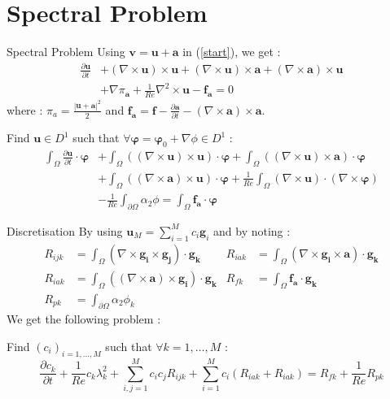 \documentclass{beamer}
\newcommand{\grad}{{\nabla}}
\newcommand{\curl}{{\nabla\times}}
\newcommand{\curll}{{\nabla^2\times}}
\begin{document}
\section{Spectral Problem}
\begin{frame}{Spectral Problem}
Using $\mathbf{v}=\mathbf{u}+\mathbf{a}$ in (\ref{start}), we get :
\begin{align*}
\frac{\partial \mathbf{u}}{\partial t} &+ (\curl \mathbf{u})\times \mathbf{u} + (\curl \mathbf{u})\times \mathbf{a} + \left(\curl \mathbf{a}\right)\times \mathbf{u} \\
&+ \grad\pi_\mathbf{a} + \frac{1}{Re}\curll \mathbf{u} - \mathbf{f_a} = 0
\end{align*}
where : $\pi_a=\frac{|\mathbf{u}+\mathbf{a}|^2}{2}$ and $\mathbf{f_a}=\mathbf{f}-\frac{\partial \mathbf{a}}{\partial t}-(\curl\mathbf{a})\times\mathbf{a}$.
\begin{block}{Find $\mathbf{u}\in D^1$ such that $\forall \bm{\varphi}=\bm{\varphi}_0+\grad\phi\in D^1$ :}
\begin{align*}
\int_\Omega \frac{\partial \mathbf{u}}{\partial t}\cdot \bm{\varphi} &+ \int_\Omega ((\curl \mathbf{u})\times \mathbf{u})\cdot \bm{\varphi} + \int_\Omega ((\curl \mathbf{u})\times \mathbf{a})\cdot\bm{\varphi} \\
&+ \int_\Omega ((\curl \mathbf{a})\times \mathbf{u})\cdot\bm{\varphi} + \frac{1}{Re}\int_\Omega (\curl \mathbf{u})\cdot(\curl\bm{\varphi}) \\
&-\frac{1}{Re}\int_{\partial\Omega} \alpha_2\phi = \int_\Omega \mathbf{f_a}\cdot\bm{\varphi}
\end{align*}
\end{block}
\end{frame}

\begin{frame}{Discretisation}
By using $\mathbf{u}_M=\sum_{i=1}^M c_i\mathbf{g}_i$ and by noting :
\begin{align*}
R_{ijk} &= \int_\Omega(\curl\mathbf{g_i}\times \mathbf{g_j})\cdot\mathbf{g_k} & R_{iak} &= \int_\Omega(\curl\mathbf{g_i}\times \mathbf{a})\cdot\mathbf{g_k}\\
R_{iak} &= \int_\Omega((\curl\mathbf{a})\times \mathbf{g_i})\cdot\mathbf{g_k} & R_{fk} &= \int_\Omega\mathbf{f_a}\cdot\mathbf{g_k}\\
R_{pk} &= \int_{\partial\Omega} \alpha_2\phi_k
\end{align*}
We get the following problem :
\begin{block}{Find $(c_i)_{i=1,\dots,M}$ such that $\forall k=1,\dots,M$ :}
\[ \frac{\partial c_k}{\partial t} + \frac{1}{Re}c_k\lambda_k^2 + \sum_{i,j=1}^Mc_ic_jR_{ijk} + \sum_{i=1}^Mc_i\left(R_{iak} + R_{iak}\right) = R_{fk} + \frac{1}{Re}R_{pk} \]
\end{block}
\end{frame}
\end{document}
